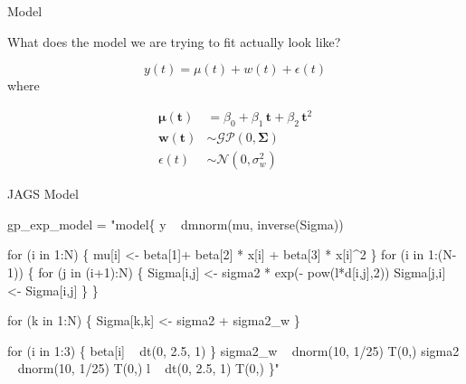 \documentclass[11pt,ignorenonframetext,]{beamer}
\newenvironment{Shaded}{}{}
\newcommand{\NormalTok}[1]{#1}
\newcommand{\StringTok}[1]{\textcolor[rgb]{0.25,0.44,0.63}{#1}}
\let\oldShaded\Shaded
\let\endoldShaded\endShaded
\renewenvironment{Shaded}{\footnotesize\begin{spacing}{0.9}\oldShaded}{\endoldShaded\end{spacing}}
\let\oldverbatim\verbatim
\let\endoldverbatim\endverbatim
\newcommand{\scriptoutput}{
  \renewenvironment{Shaded}{\scriptsize\begin{spacing}{0.9}\oldShaded}{\endoldShaded\end{spacing}}
  \renewenvironment{verbatim}{\scriptsize\begin{spacing}{0.9}\oldverbatim}{\endoldverbatim\end{spacing}}
}
\begin{document}
\begin{frame}[t]{%
\protect\hypertarget{model}{%
Model}}

What does the model we are trying to fit actually look like?

\pause

\vspace{2mm}

\[ y(t) = \mu(t) + w(t) + \epsilon(t) \] where

\[\begin{aligned}
\symbf{\mu(t)} &= \beta_0 + \beta_1\, \symbf{t} +\beta_2\, \symbf{t}^2\\
\symbf{w(t)} &\sim \mathcal{GP}(0, \symbf{\Sigma}) \\
\epsilon(t) &\sim \mathcal{N}(0, \sigma^2_w)
\end{aligned}\]

\end{frame}

\begin{frame}[fragile]{%
\protect\hypertarget{jags-model}{%
JAGS Model}}

\scriptoutput

\begin{Shaded}
\begin{Highlighting}[]
\NormalTok{gp_exp_model =}\StringTok{ "model\{}
\StringTok{  y ~ dmnorm(mu, inverse(Sigma))}

\StringTok{  for (i in 1:N) \{}
\StringTok{    mu[i] <- beta[1]+ beta[2] * x[i] + beta[3] * x[i]^2}
\StringTok{  \}}
\StringTok{  }
\StringTok{  for (i in 1:(N-1)) \{}
\StringTok{    for (j in (i+1):N) \{}
\StringTok{      Sigma[i,j] <- sigma2 * exp(- pow(l*d[i,j],2))}
\StringTok{      Sigma[j,i] <- Sigma[i,j]}
\StringTok{    \}}
\StringTok{  \}}

\StringTok{  for (k in 1:N) \{}
\StringTok{    Sigma[k,k] <- sigma2 + sigma2_w}
\StringTok{  \}}

\StringTok{  for (i in 1:3) \{}
\StringTok{    beta[i] ~ dt(0, 2.5, 1)}
\StringTok{  \}}
\StringTok{  sigma2_w ~ dnorm(10, 1/25) T(0,)}
\StringTok{  sigma2   ~ dnorm(10, 1/25) T(0,)}
\StringTok{  l        ~ dt(0, 2.5, 1) T(0,) }
\StringTok{\}"}
\end{Highlighting}
\end{Shaded}

\end{frame}
\end{document}
